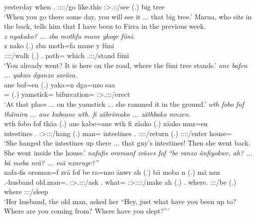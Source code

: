 \begin{exe}
	{\Indf} yesterday when \Med.{\All} \Ssg:\Sbj:\Imp:\Ipfv:\Andat/go {like.this} {\Fut} \Stsg:\Sbj>\Tsg.\Masc:\Nonpast:\Ipfv/see (.) {\Dem} big tree\\
	\trans `When you go there some day, you will see it ... that big tree.'
	{\footnotesize{Marua, who sits in the back, tells him that I have been to Firra in the previous week.}}\\
	\emph{z nyakako? ... zba mothfa mane ykogr füni.}\\
	\gll z nako (.) zba moth=fa mane y füni\\
	{\Iam} \Ssg:\Sbj:\Pst:\Ipfv:\Andat/walk (.) \Prox.{\Abl} path={\Abl} which \Tsg.\Masc:\Sbj:\Nonpast:\Stat/stand füni\\
	\trans `You already went? It is here on the road, where the füni tree stands.'
	\emph{ane bafen ... yakan dganzo saräsa.}\\
	\gll ane baf=en (.) yaka=n dga=nzo saa\\
	{\Dem} \Recog={\Loc} (.) yamstick={\Loc} bifurcation={\Only} \Sg:\Sbj>\Tsg.\Masc:\Obj:\Pst:\Pfv/erect\\
	\trans `At that place ... on the yamstick ... she rammed it in the ground.'
\newpage 	
{}
	\emph{wth fobo fof thämira ... ane kabeane wth. fi zäbrimako ... zäthbako mnzen.}\\
	\gll wth fobo fof thäa (.) ane kabe=ane wth fi zäako (.) zäako mnz=en\\
	intestines \Dist.{\All} {\Emph} \Sg:\Sbj>\Stpl:\Obj:\Pst:\Pfv/hang (.) {\Dem} man={\Poss} intestines \Third.{\Abs} \Sg:\Sbj:\Pst:\Pfv:\Andat/return (.) \Sg:\Sbj:\Pst:\Pfv:\Andat/enter house=\Loc\\
	\trans `She hanged the intestines up there ... that guy's intestines! Then she went back. She went inside the house.'
	\emph{nafafis oromanf zräses fof ``be ranzo änfiyokwr, ah? ... bä moba nrä? ... mä nznrugr?''}\\
	\gll nafa-fis oroman=f zrä fof be ra=nzo änwr ah (.) bä moba n (.) mä nzn\\
	\Third.\Poss-husband {old.man}=\Erg.{\Sg} \Stsg:\Sbj>\Tsg.\F:\Obj:\Irr:\Pfv/ask {\Emph} \Ssg.{\Erg} what={\Only} \Stsg:\Sbj>\Stpl:\Obj:\Nonpast:\Ipfv:\Venit/make ah (.) \Second.{\Abs} where.{\Abl} \Ssg:\Sbj:\Nonpast:\Ipfv/be (.) where \Ssg:\Sbj:\Rpst:\Ipfv/sleep\\
	\trans `Her husband, the old man, asked her ``Hey, just what have you been up to? Where are you coming from? Where have you slept?'''

\end{exe}
